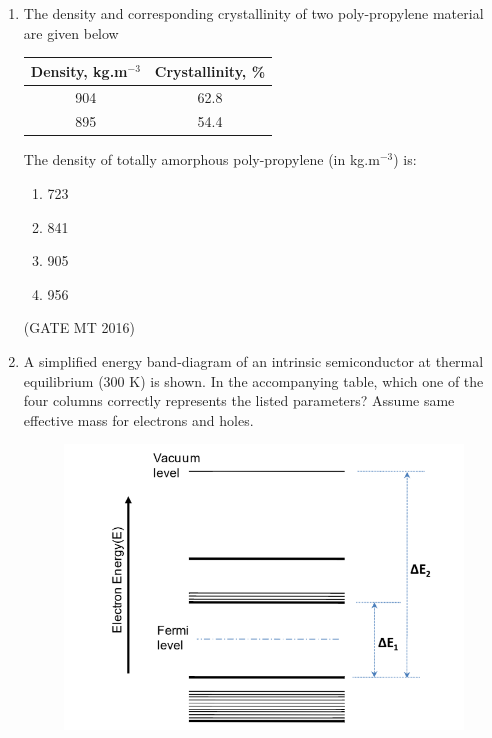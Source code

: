 \documentclass[11pt, letterpaper]{article}
\theoremstyle{remark}
\begin{document}
\begin{enumerate}
\begin{multicols}{4}
\begin{enumerate}
\item $0.36$  
\item $1.55$  
\item $3.65$  
\item $7.30$  
\end{enumerate}
\end{multicols}
\hfill(GATE MT 2016)

\item The density and corresponding crystallinity of two poly-propylene material are given below

\begin{center}
\begin{tabular}{|c|c|}
\hline
Density, kg.m$^{-3}$ & Crystallinity, \% \\
\hline
904 & 62.8 \\
895 & 54.4 \\
\hline
\end{tabular}
\end{center}

The density of totally amorphous poly-propylene (in kg.m$^{-3}$) is:

\begin{multicols}{4}
\begin{enumerate}
\item 723  
\item 841  
\item 905  
\item 956  
\end{enumerate}
\end{multicols}
\hfill(GATE MT 2016)

\item A simplified energy band-diagram of an intrinsic semiconductor at thermal equilibrium (300 K) is shown. In the accompanying table, which one of the four columns correctly represents the listed parameters? Assume same effective mass for electrons and holes.

\begin{figure}[H]
    \centering
    \includegraphics[width=0.5\linewidth]{figs/image5'.png}
    \caption{}
    \label{fig:placeholder}
\end{figure}


\end{enumerate}
\end{document}
